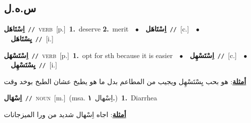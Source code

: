 \documentclass[10pt,a4paper,twoside]{article} %
\begin{document}
\begin{multicols}{2}
\vspace{-3mm}
\subsection*{\color{blue}\foreignlanguage{arabic}{س.ه.ل}\color{blue}{}} 

{\setlength\topsep{0pt}\textbf{\foreignlanguage{arabic}{اِسْتَاهَل}}\ {\color{gray}\texttt{//}\color{black}}\ \textsc{verb}\ [p.]\ \textbf{1.}~deserve  \textbf{2.}~merit\ \ $\bullet$\ \ \setlength\topsep{0pt}\textbf{\foreignlanguage{arabic}{اِسْتَاهَل}}\ {\color{gray}\texttt{//}\color{black}}\ [c.]\ \ $\bullet$\ \ \setlength\topsep{0pt}\textbf{\foreignlanguage{arabic}{يِسْتَاهَل}}\ {\color{gray}\texttt{//}\color{black}}\ [i.]\ } \vspace{2mm}

{\setlength\topsep{0pt}\textbf{\foreignlanguage{arabic}{اِسْتَسْهَل}}\ {\color{gray}\texttt{//}\color{black}}\ \textsc{verb}\ [p.]\ \textbf{1.}~opt for sth because it is easier\ \ $\bullet$\ \ \setlength\topsep{0pt}\textbf{\foreignlanguage{arabic}{اِسْتَسْهِل}}\ {\color{gray}\texttt{//}\color{black}}\ [c.]\ \ $\bullet$\ \ \setlength\topsep{0pt}\textbf{\foreignlanguage{arabic}{يِسْتَسْهِل}}\ {\color{gray}\texttt{//}\color{black}}\ [i.]\  \begin{flushright}\color{gray}\foreignlanguage{arabic}{\textbf{\underline{\foreignlanguage{arabic}{أمثلة}}}: هو بحب يِسْتَسْهِل ويجيب من المطاعم بدل ما هو يطبخ عشان الطبخ بوخد وقت}\end{flushright}\color{black}} \vspace{2mm}

{\setlength\topsep{0pt}\textbf{\foreignlanguage{arabic}{اِسْهَال}}\ {\color{gray}\texttt{//}\color{black}}\ \textsc{noun}\ [m.]\ \color{gray}(msa. \foreignlanguage{arabic}{اِسْهال}~\foreignlanguage{arabic}{\textbf{١.}})\color{black}\ \textbf{1.}~Diarrhea\  \begin{flushright}\color{gray}\foreignlanguage{arabic}{\textbf{\underline{\foreignlanguage{arabic}{أمثلة}}}: اجاه اِسْهال شديد من ورا الميزجانات}\end{flushright}\color{black}} \vspace{2mm}


\end{multicols}
\end{document}
